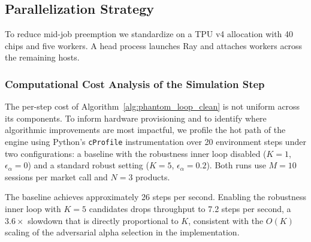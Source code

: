 \subsection{Parallelization Strategy}

To reduce mid-job preemption we standardize on a TPU v4 allocation with 40 chips and five workers. A head process launches Ray \parencite{moritz_ray_2018} and attaches workers across the remaining hosts.

\subsubsection{Computational Cost Analysis of the Simulation Step}
The per-step cost of Algorithm~\ref{alg:phantom_loop_clean} is not uniform across its components. To inform hardware provisioning and to identify where algorithmic improvements are most impactful, we profile the hot path of the engine using Python's \texttt{cProfile} instrumentation over 20 environment steps under two configurations: a baseline with the robustness inner loop disabled ($K=1$, $\epsilon_\alpha=0$) and a standard robust setting ($K=5$, $\epsilon_\alpha=0.2$). Both runs use $M=10$ sessions per market call and $N=3$ products.

The baseline achieves approximately 26 steps per second. Enabling the robustness inner loop with $K=5$ candidates drops throughput to 7.2 steps per second, a $3.6\times$ slowdown that is directly proportional to $K$, consistent with the $O(K)$ scaling of the adversarial alpha selection in the implementation.

